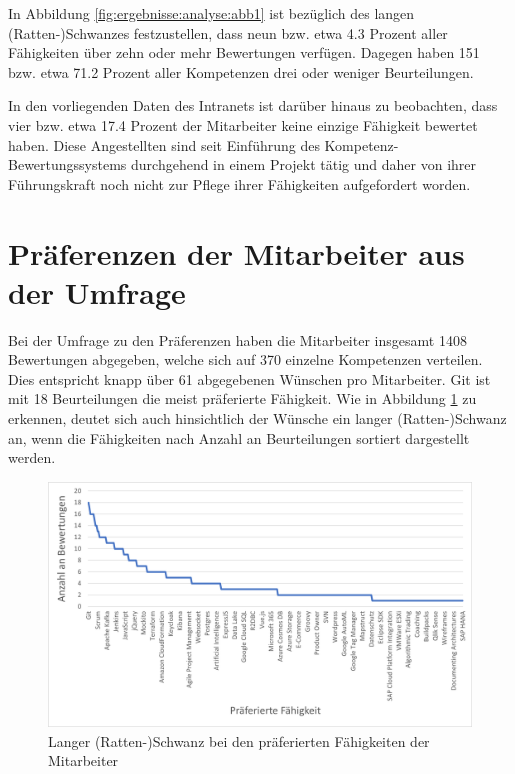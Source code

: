 In Abbildung \ref{fig:ergebnisse:analyse:abb1} ist bezüglich des langen (Ratten-)Schwanzes festzustellen, dass neun bzw. etwa 4.3 Prozent aller Fähigkeiten über zehn oder mehr Bewertungen verfügen. Dagegen haben 151 bzw. etwa 71.2 Prozent aller Kompetenzen drei oder weniger Beurteilungen.

In den vorliegenden Daten des Intranets ist darüber hinaus zu beobachten, dass vier bzw. etwa 17.4 Prozent der Mitarbeiter keine einzige Fähigkeit bewertet haben. Diese Angestellten sind seit Einführung des Kompetenz-Bewertungssystems durchgehend in einem Projekt tätig und daher von ihrer Führungskraft noch nicht zur Pflege ihrer Fähigkeiten aufgefordert worden.

\section{Präferenzen der Mitarbeiter aus der Umfrage}
\label{ch:ergebnisse:analyse2}
Bei der Umfrage zu den Präferenzen haben die Mitarbeiter insgesamt 1408 Bewertungen abgegeben, welche sich auf 370 einzelne Kompetenzen verteilen. Dies entspricht knapp über 61 abgegebenen Wünschen pro Mitarbeiter. Git ist mit 18 Beurteilungen die meist präferierte Fähigkeit. Wie in Abbildung \ref{fig:ergebnisse:analyse:abb2} zu erkennen, deutet sich auch hinsichtlich der Wünsche ein langer (Ratten-)Schwanz an, wenn die Fähigkeiten nach Anzahl an Beurteilungen sortiert dargestellt werden.
 
\begin{figure}[h]
	\centering
	\includegraphics[width=1\textwidth]{gfx/long-tail-praeferenzen.png}
	\caption{Langer (Ratten-)Schwanz bei den präferierten Fähigkeiten der Mitarbeiter}
	\label{fig:ergebnisse:analyse:abb2}
\end{figure}

